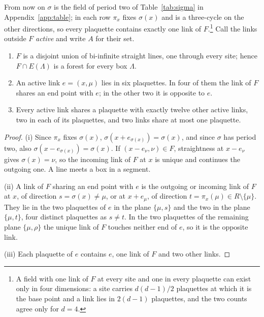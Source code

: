 From now on $\sigma$ is the field of period two of Table~\ref{tab:sigma} in
Appendix~\ref{app:table}; in each row $\pi_x$ fixes $\sigma(x)$ and is a
three-cycle on the other directions, so every plaquette contains exactly one
link of $F$.\footnote{A field with one link of $F$ at every site and one in
every plaquette can exist only in four dimensions: a site carries
$d(d-1)/2$ plaquettes at which it is the base point and a link lies in
$2(d-1)$ plaquettes, and the two counts agree only for $d=4$.} Call the links
outside $F$ \emph{active} and write $A$ for their set.

\begin{lemma}\label{lem:structure}\leavevmode
\begin{enumerate}[label=\textup{(\roman*)},leftmargin=*]
\item $F$ is a disjoint union of bi-infinite straight lines, one through every
site; hence $F\cap E(\Lambda)$ is a forest for every box $\Lambda$.
\item An active link $e=(x,\mu)$ lies in six plaquettes. In four of them the
link of $F$ shares an end point with $e$; in the other two it is opposite to
$e$.
\item Every active link shares a plaquette with exactly twelve other active
links, two in each of its plaquettes, and two links share at most one
plaquette.
\end{enumerate}
\end{lemma}

\begin{proof}
(i) Since $\pi_x$ fixes $\sigma(x)$, $\sigma(x+e_{\sigma(x)})=\sigma(x)$, and since
$\sigma$ has period two, also $\sigma(x-e_{\sigma(x)})=\sigma(x)$. If $(x-e_\nu,\nu)
\in F$, straightness at $x-e_\nu$ gives $\sigma(x)=\nu$, so the incoming link of
$F$ at $x$ is unique and continues the outgoing one. A line meets a box in a
segment.

(ii) A link of $F$ sharing an end point with $e$ is the outgoing or incoming
link of $F$ at $x$, of direction $s=\sigma(x)\ne\mu$, or at $x+e_\mu$, of
direction $t=\pi_x(\mu)\in R\setminus\{\mu\}$. They lie in the two plaquettes of
$e$ in the plane $\{\mu,s\}$ and the two in the plane $\{\mu,t\}$, four distinct
plaquettes as $s\ne t$. In the two plaquettes of the remaining plane
$\{\mu,\rho\}$ the unique link of $F$ touches neither end of $e$, so it is the
opposite link.

(iii) Each plaquette of $e$ contains $e$, one link of $F$ and two other links.
\end{proof}

